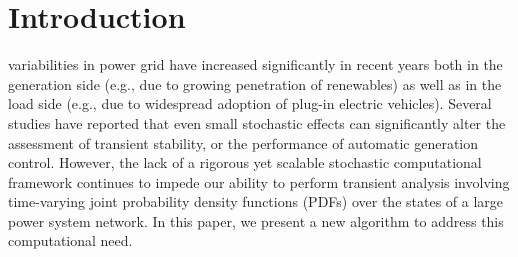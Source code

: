 \documentclass[10pt,twocolumn]{IEEEtran}
\begin{document}
\section{Introduction}\label{sec:intro}

 variabilities in power grid have increased significantly in recent years both in the generation side (e.g., due to growing penetration of renewables) as well as in the load side (e.g., due to widespread adoption of plug-in electric vehicles). Several studies \cite{timko1983monte,nwankpa1992stochastic,odun2012structure,ghanavati2016identifying,apostolopoulou2016assessment} have reported that even small stochastic effects can significantly alter the assessment of transient stability, or the performance of automatic generation control. However, the lack of a rigorous yet scalable stochastic computational framework continues to impede \cite{schwalbe2015mathematical} our ability to perform transient analysis involving time-varying joint probability density functions (PDFs) over the states of a large power system network. In this paper, we present a new algorithm to address this computational need.  
\end{document}
